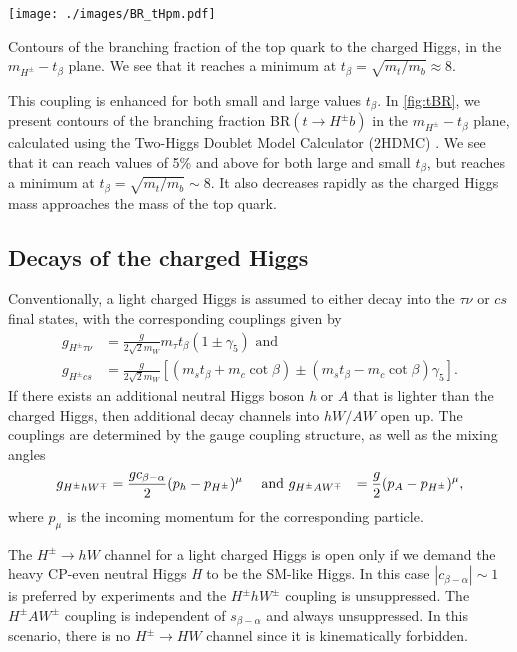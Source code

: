 \begin{marginfigure}[-1in]
\centering
	\texttt{[image: ./images/BR\_tHpm.pdf]}
    \caption{Contours of the branching fraction of the top quark to the charged Higgs, in the $m_{H^{\pm}}-t_{\beta}$ plane. We see that it reaches a minimum at $t_\beta = \sqrt{m_t/m_b} \approx 8$.}
\label{fig:tBR}
\end{marginfigure}

This coupling is enhanced for both small and large values $t_{\beta}$. In \autoref{fig:tBR}, we present contours of the branching fraction BR$(t \rightarrow H^{\pm} b)$ in the $m_{H^{\pm}}-t_{\beta}$ plane, calculated using the Two-Higgs Doublet Model Calculator ($2$HDMC) \cite{Eriksson:2009ws}. We see that it can reach values of 5\% and above for both large and small $t_{\beta}$, but reaches a minimum at $t_{\beta} = \sqrt{m_t/m_b}\sim 8 $. It also decreases rapidly as the charged Higgs mass approaches the mass of the top quark.

\subsection{Decays of the charged Higgs}
Conventionally, a light charged Higgs is assumed to either decay into the $\tau\nu$ or $cs$ final states, with the corresponding couplings given by
\begin{align*}
  g_{H^{\pm} \tau\nu} &= \frac{g}{2 \sqrt{2} m_W} m_\tau t_{\beta}(1\pm \gamma_5 ) \text{ and} \\
g_{H^{\pm} cs} &= \frac{g}{2 \sqrt{2} m_W} \left[ (m_s t_{\beta} + m_c \cot \beta ) \pm (m_s t_{\beta} - m_c \cot \beta ) \gamma_5 \right].
 \end{align*}
If there exists an additional neutral Higgs boson \emph{h} or $A$ that is lighter than the charged Higgs, then additional decay channels into $hW/AW$ open up. The couplings are determined by the gauge coupling structure, as well as the mixing angles \cite{Gunion:1989we} 
\begin{align*}
  g_{H^{\pm} h W^{\mp}}&= \frac{gc_{\beta-\alpha}}{2}(p_{h}-p_{H^{\pm}})^\mu &\text{ and }& 
 g_{H^{\pm} A W^{\mp}}&= \frac{g}{2}(p_{A}-p_{H^{\pm}})^\mu,
 \end{align*}
where $p_\mu$ is the incoming momentum for the corresponding particle. 

The $H^{\pm}\rightarrow hW$ channel for a light charged Higgs is open only if we demand the heavy CP-even neutral Higgs \emph{H} to be the SM-like Higgs. In this case $|c_{\beta-\alpha}| \sim 1$ is preferred by experiments and the $H^{\pm}hW^{\pm}$ coupling is unsuppressed. The $H^{\pm} A W^{\pm}$ coupling is independent of $s_{\beta-\alpha}$ and always unsuppressed. In this scenario, there is no $H^{\pm} \rightarrow HW$ channel since it is kinematically forbidden.

